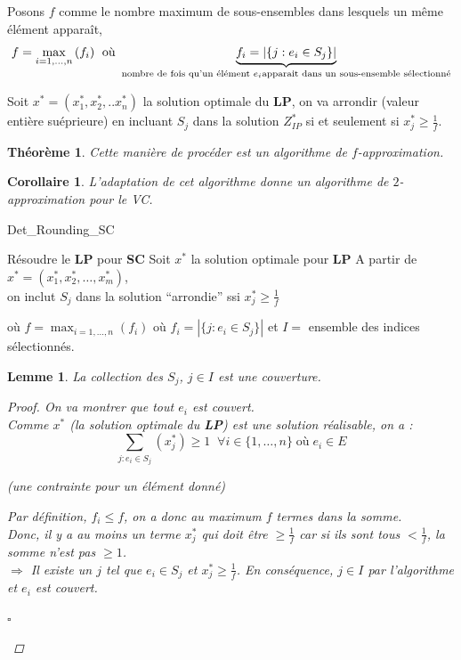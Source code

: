 \documentclass[12pt]{article}
\newcommand{\titre}[1]{\textcolor{title}{#1}}
\newcommand{\cqfd}{\begin{flushright}$\square$\end{flushright}}
\newtheorem{corollaire}{Corollaire}[section]
\newtheorem{thm}{Th\'eor\`eme}[section]
\newtheorem{lemme}{Lemme}[section]
\newtheorem{proof}{Preuve}[section]
\begin{document}
Posons $f$ comme le nombre maximum de sous-ensembles dans lesquels un même élément apparaît,
$$f = \max_{i=1,\ldots,n}{(f_i)} \; \text{ où } \underbrace{f_i = \left| \{j : e_i \in S_j \}
\right|}_{\text{nombre de fois qu'un élément $e_i$ \\ apparait dans un sous-ensemble sélectionné}}$$

Soit $x^* = (x_1^*, x_2^*, .. x_n^*)$ la solution optimale du \textbf{LP},
on va arrondir (valeur entière suéprieure) en incluant $S_j$ dans la solution $Z^*_{IP}$ si et seulement si
$x_j^* \geq \frac{1}{f}$.

\begin{thm}
Cette manière de procéder est un algorithme de $f$-\textit{approximation}.
\end{thm}
\begin{corollaire}
L'adaptation de cet algorithme donne un algorithme de $2$-approximation pour le
\titre{VC}.
\end{corollaire}

\begin{algorithm}[h!]
\caption{Det\_Rounding\_SC}
\begin{algorithmic}[1]
\STATE Résoudre le \textbf{LP} pour \textbf{\titre{SC}}
\STATE Soit $x^*$ la solution optimale pour \textbf{LP}
\STATE A partir de $x^* = (x^*_1,x^*_2, \ldots, x^*_m)$,\\
on inclut $S_j$ dans la solution ``arrondie'' ssi $x^*_j \geq \frac{1}{f}$
\end{algorithmic}
\end{algorithm}

où $f = \max_{i=1,...,n} (f_i)$ où $f_i = |\{j:e_i \in S_j\}|$ et $I =$ ensemble
des indices sélectionnés.

\begin{lemme}
La collection des $S_j$, $j \in I$ est une couverture.
\begin{proof}
On va montrer que tout $e_i$ est couvert.\\
Comme $x^*$ \textit{(la solution optimale du \textbf{LP})} est une solution
réalisable, on a :
$$\sum_{j : e_i\in S_j} (x^*_j) \geq 1 \; \; \forall i \in \{1, \dots, n \} \;
\text{où} \; e_i \in E$$
\begin{center}\textit{(une contrainte pour un élément donné)}\end{center}
Par définition, $f_i \leq f$, on a donc au maximum $f$ termes dans la somme. \\
Donc, il y a au moins un terme $x^*_j$ qui doit être $\geq \frac{1}{f}$ car si
ils sont tous $<\frac{1}{f}$, la somme n'est pas $\geq 1$.\\
$\Rightarrow$ Il existe un $j$ tel que $e_i \in S_j$ et $x^*_j \geq \frac{1}{f}$.
En conséquence, $j \in I$ par l'algorithme et $e_i$ est couvert.
\cqfd
\end{proof}
\end{lemme}
\end{document}
